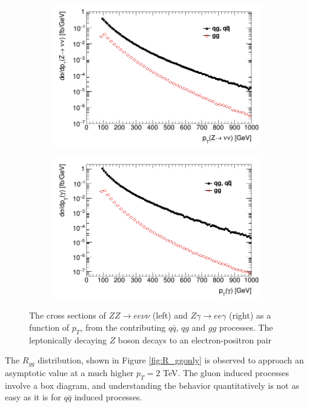\documentclass[12pt,a4paper,openright,twoside]{report}
\begin{document}
\begin{figure}[H]
\centering
	\begin{subfigure}{0.49\textwidth}
		\includegraphics[width=\linewidth]{ZZ_subproc.png}
	\end{subfigure}
	\begin{subfigure}{0.49\textwidth}
		\includegraphics[width=\linewidth]{Zg_subproc.png}
	\end{subfigure}	
\caption{The cross sections of $ZZ\to ee\nu\nu$ (left) and $Z\gamma\to ee\gamma$ (right) as a function of $p_T$, from the contributing $q\bar{q}$, $qg$ and $gg$ processes. The leptonically decaying $Z$ boson decays to an electron-positron pair}
\label{fig:xsec_gg_qq}
\end{figure}

The $R_{gg}$ distribution, shown in Figure \ref{fig:R_ggonly} is observed to approach an asymptotic value at a much higher $p_T = 2$ TeV. The gluon induced processes involve a box diagram, and understanding the behavior quantitatively is not as easy as it is for $q\bar{q}$ induced processes.
\end{document}

